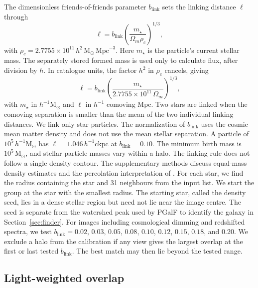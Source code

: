 \documentclass[usenatbib]{mnras}
\begin{document}
\label{sec:group}

The dimensionless friends-of-friends parameter $b_{\mathrm{link}}$ sets the linking
distance $\ell$ through
\begin{equation}
\ell
=
b_{\mathrm{link}}\left(\frac{m_{\star}}{\Omega_{m}\rho_{c}}\right)^{1/3},
\label{eq:link}
\end{equation}
with $\rho_{c}=2.7755\times10^{11}\,h^{2}\,\mathrm{M}_{\odot}\,\mathrm{Mpc}^{-3}$.
Here $m_{\star}$ is the particle's current stellar mass. The separately
stored formed mass is used only to calculate flux, after division by
$h$. In catalogue units, the factor $h^{2}$ in $\rho_{c}$ cancels, giving
\begin{equation}
\ell
=
b_{\mathrm{link}}\left(\frac{m_{\star}}{2.7755\times10^{11}\,\Omega_{m}}\right)^{1/3},
\label{eq:linkcode}
\end{equation}
with $m_{\star}$ in $h^{-1}\mathrm{M}_{\odot}$ and $\ell$ in $h^{-1}$ comoving Mpc.
Two stars are linked when the comoving separation is smaller than the
mean of the two individual linking distances.
We link only star particles. The normalization of $b_{\mathrm{link}}$ uses the cosmic
mean matter density \citep{davis1985} and does not use the mean stellar
separation.
A particle of $10^{5}\,h^{-1}\mathrm{M}_{\odot}$ has
$\ell=1.046\,h^{-1}\mathrm{ckpc}$ at $b_{\mathrm{link}}=0.10$.
The minimum birth mass is $10^{5}\,\mathrm{M}_{\odot}$, and stellar particle
masses vary within a halo. The linking rule does not follow a single
density contour. The supplementary methods discuss equal-mass density
estimates and the percolation interpretation of \citet{more2011}.
For each star, we find the radius containing the star and 31 neighbours
from the input list. We start the group at the star with the smallest
radius. The starting star, called the
density seed, lies in a dense stellar region but need not lie near the
image centre. The seed is separate from the watershed peak used by
PGalF to identify the galaxy in Section~\ref{sec:finder}.
For images including cosmological dimming and redshifted spectra, we
test $b_{\mathrm{link}}=0.02$, $0.03$, $0.05$, $0.08$,
$0.10$, $0.12$, $0.15$, $0.18$, and $0.20$.
We exclude a halo from the calibration if any view gives the largest
overlap at the first or last tested $b_{\mathrm{link}}$. The best match may then lie
beyond the tested range.

\subsection{Light-weighted overlap}
\label{sec:iou}
\end{document}
